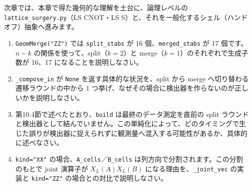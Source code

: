 次章では、本章で得た幾何的な理解を土台に、論理レベルの \texttt{lattice\_surgery.py}（LS CNOT・LS S）と、それを一般化するシェル（ハンドオフ）抽象へ進みます。

\begin{exercise}
  \begin{enumerate}
    \item \texttt{GeomMerge("ZZ")} では \texttt{split\_stabs} が 16 個、\texttt{merged\_stabs} が 17 個です。$n-k$ の関係を使って、split（$k=2$）と merge（$k=1$）のそれぞれで生成子数が 16、17 になることを説明しなさい。
    \item \texttt{\_compose\_in} が \texttt{None} を返す具体的な状況を、split から merge へ切り替わる遷移ラウンドの中から 1 つ挙げ、なぜその場合に検出器を作らないのが正しいかを説明しなさい。
    \item 第10.4節で述べたとおり、\texttt{build} は最終のデータ測定を直前の split ラウンドと検出器として結んでいません。この単純化によって、どのタイミングで生じた誤りが検出器に捉えられずに観測量へ混入する可能性があるか、具体的に述べなさい。
    \item \texttt{kind="XX"} の場合、\texttt{A\_cells}／\texttt{B\_cells} は列方向で分割されます。この分割のもとで joint 演算子が $X_L(A)X_L(B)$ になる理由を、\texttt{\_joint\_vec} の実装と \texttt{kind="ZZ"} の場合との対比で説明しなさい。
  \end{enumerate}
\end{exercise}
